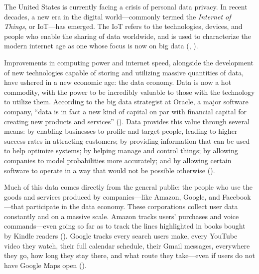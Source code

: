 \documentclass[water,article,submit,moreauthors,pdftex]{mdpi}
\begin{document}

The United States is currently facing a crisis of personal data privacy.
In recent decades, a new era in the digital world---commonly termed the
\emph{Internet of Things}, or IoT---has emerged. The IoT refers to the
technologies, devices, and people who enable the sharing of data
worldwide, and is used to characterize the modern internet age as one
whose focus is now on big data (\citet{atzori2010internet},
\citet{elvy2018commodifying}).

Improvements in computing power and internet speed, alongside the
development of new technologies capable of storing and utilizing massive
quantities of data, have ushered in a new economic age: the data
economy. Data is now a hot commodity, with the power to be incredibly
valuable to those with the technology to utilize them. According to the
big data strategist at Oracle, a major software company, ``data is in
fact a new kind of capital on par with financial capital for creating
new products and services'' (\citet{oracle_quote}). Data provides this
value through several means: by enabling businesses to profile and
target people, leading to higher success rates in attracting customers;
by providing information that can be used to help optimize systems; by
helping manage and control things; by allowing companies to model
probabilities more accurately; and by allowing certain software to
operate in a way that would not be possible otherwise
(\citet{sadowski2019data}).

Much of this data comes directly from the general public: the people who
use the goods and services produced by companies---like Amazon, Google,
and Facebook---that participate in the data economy. These corporations
collect user data constantly and on a massive scale. Amazon tracks
users' purchases and voice commands---even going so far as to track the
lines highlighted in books bought by Kindle readers
(\citet{amazon-kindle}). Google tracks every search users make, every
YouTube video they watch, their full calendar schedule, their Gmail
messages, everywhere they go, how long they stay there, and what route
they take---even if users do not have Google Maps open
(\citet{google-safety}).
\end{document}
